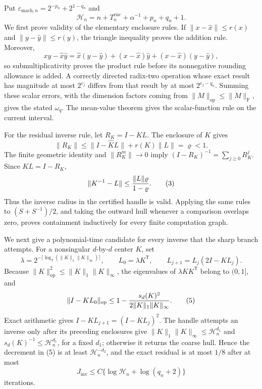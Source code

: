 Put \(\varepsilon_{
\mathrm{mach},n}=2^{-p_n}+2^{1-q_n}\) and
\[
\mathcal H_n=n+T_n^{\mathrm{enc}}+\alpha^{-1}+p_n+q_n+1.
\]
We first prove validity of the elementary enclosure rules.  If
\(\|x-\widehat x\|\le r(x)\) and \(\|y-\widehat y\|\le r(y)\), the triangle
inequality proves the addition rule.  Moreover,
\[
xy-\widehat x\widehat y
=\widehat x(y-\widehat y)+(x-\widehat x)\widehat y
+(x-\widehat x)(y-\widehat y),                                      \tag{1}
\]
so submultiplicativity proves the product rule before its nonnegative rounding
allowance is added.  A correctly directed radix-two operation whose exact result
has magnitude at most \(2^{e_j}\) differs from that result by at most
\(2^{e_j-q_n}\).  Summing these scalar errors, with the dimension factors coming
from \(\|M\|_{\mathrm{op}}\le\|M\|_{\mathrm F}\), gives the stated
\(\omega_q\).  The mean-value theorem gives the scalar-function rule on the
current interval.

For the residual inverse rule, let \(R_K=I-KL\).  The enclosure of \(K\) gives
\[
\|R_K\|\le \|I-\widehat K L\|+r(K)\|L\|=\varrho<1.                 \tag{2}
\]
The finite geometric identity and \(\|R_K^m\|\to0\) imply
\((I-R_K)^{-1}=\sum_{j\ge0}R_K^j\).  Since \(KL=I-R_K\),
\[
\|K^{-1}-L\|
\le {\|L\|\varrho\over1-\varrho}.                                  \tag{3}
\]
Thus the inverse radius in the certified handle is valid.  Applying the same
rules to \((S+S^{-1})/2\), and taking the outward hull whenever a comparison
overlaps zero, proves containment inductively for every finite computation graph.

We next give a polynomial-time candidate for every inverse that the sharp branch
attempts.  For a nonsingular \(d\)-by-\(d\) center \(K\), set
\[
\lambda=2^{-\lceil\log_2(\|K\|_1\|K\|_\infty)\rceil},\qquad
L_0=\lambda K^{\mathsf T},\qquad
L_{j+1}=L_j(2I-KL_j).                                                \tag{4}
\]
Because \(\|K\|_{\mathrm{op}}^2\le\|K\|_1\|K\|_\infty\), the eigenvalues
of \(\lambda KK^{\mathsf T}\) belong to \((0,1]\), and
\[
\|I-KL_0\|_{
\mathrm{op}}
\le1-{s_d(K)^2\over2\|K\|_1\|K\|_\infty}.                         \tag{5}
\]
Exact arithmetic gives \(I-KL_{j+1}=(I-KL_j)^2\).  The handle attempts an
inverse only after its preceding enclosures give
\(\|K\|_1\|K\|_\infty\le\mathcal H_n^{d_1}\) and
\(s_d(K)^{-1}\le\mathcal H_n^{d_1}\), for a fixed \(d_1\); otherwise it
returns the coarse hull.  Hence the decrement in (5) is at least
\(\mathcal H_n^{-d_2}\), and the exact residual is at most \(1/8\) after at
most
\[
J_{
\mathrm{inv}}\le C\{\log\mathcal H_n+\log(q_n+2)\}                \tag{6}
\]
iterations.

